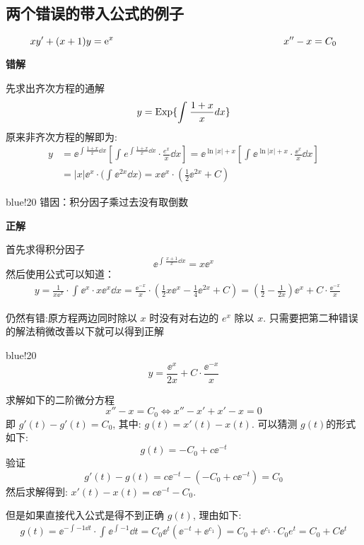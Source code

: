 \clearpage

\subsection{两个错误的带入公式的例子}
\begin{framed}
\[
    xy'+(x+1)y=\ee^x \hspace*{.5\linewidth} x'' -x = C_0   
\]
\end{framed}

{\bf 错解}

先求出齐次方程的通解
\[
    y={\rm Exp}\{\int_{}^{}{\frac{1+x}{x} dx}\}
\]
原来非齐次方程的解即为:
\begin{align*}
    y & = \ee^{\int_{}^{}{\frac{1+x}{x} \dd x}}[\int_{}^{}{e^{\int_{}^{}{\frac{1+x}{x} \dd x}}\cdot \frac{e^x}{x} \dd x}]
        = \ee^{\ln |x|+x}[\int_{}^{}{\ee^{\ln |x|+x} \cdot \frac{\ee^x} {x}\dd x}]\\
      & = |x|\ee^x\cdot\biggl(\int_{}^{}{\ee^{2x} \dd x}\biggr)
        = x\ee^x\cdot(\frac{1}{2}\ee^{2x}+C)
\end{align*}

\begin{formal}{blue!20}
    错因：积分因子乘过去没有取倒数
\end{formal}
{\bf 正解}

首先求得积分因子
\[
    \ee^{\int_{}^{}{\frac{x+1}{x} \dd x}}=x\ee^x    
\]
然后使用公式可以知道：
\begin{align*}
    & y = \frac{1}{x\ee^x}\cdot \int_{}^{}{\ee^x\cdot x\ee^x \dd x}
        = \frac{\ee^{-x}}{x}\cdot (\frac{1}{2}x\ee^x-\frac{1}{4}\ee^{2x}+C)
        = (\frac{1}{2}-\frac{1}{2x})\ee^x + C\cdot \frac{\ee^{-x}}{x}
\end{align*} 

仍然有错:原方程两边同时除以 $x$ 时没有对右边的 $e^x$ 除以 $x$.
只需要把第二种错误的解法稍微改善以下就可以得到正解
\begin{formal}{blue!20}
\[
    \displaystyle y = \frac{\ee^x}{2x}+C\cdot\frac{\ee^{-x}}{x}
\]
\end{formal}  


求解如下的二阶微分方程
\[
    x'' -x = C_0  \Longleftrightarrow x'' - x' + x' - x = 0
\]
即 $g'(t) - g'(t) = C_0$, 其中: $g(t) = x'(t) -x(t)$. 可以猜测 $g(t)$的形式如下:
\[
    g(t) = -C_0 + c\ee^{-t}    
\]
验证
\[
    g'(t) - g(t) = c\ee^{-t} -(-C_0 + c\ee^{-t}) = C_0    
\]
然后求解得到: $x'(t) - x(t) = c\ee^{-t} -C_0$.

但是如果直接代入公式是得不到正确 $g(t)$, 理由如下:
\begin{align*}
    g(t) = \ee^{-\int_{}^{}{-1}\dd t}\cdot \int_{}^{}{\ee^{\int_{}^{}{-1}}\dd t}
         = C_0 \ee^{t} (\ee^{-t}+\ee^{c_1}) 
         = C_0 + \ee^{c_1}\cdot C_0  e^t
         = C_0 + C\ee^t
\end{align*} 